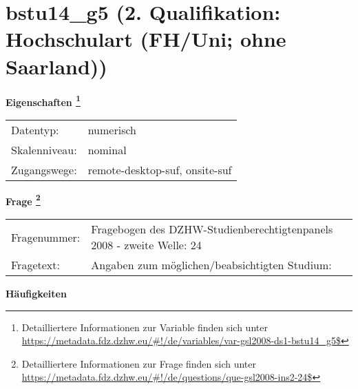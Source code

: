 
    \setcounter{footnote}{0}

    \vspace*{-1.8cm}
	\section{bstu14\_g5 (2. Qualifikation: Hochschulart (FH/Uni; ohne Saarland))}
	\label{section:bstu14_g5}



    \vspace*{0.5cm}
    \noindent\textbf{Eigenschaften
	\footnote{Detailliertere Informationen zur Variable finden sich unter
		\url{https://metadata.fdz.dzhw.eu/\#!/de/variables/var-gsl2008-ds1-bstu14_g5$}}}\\
	\begin{tabularx}{\hsize}{@{}lX}
	Datentyp: & numerisch \\
	Skalenniveau: & nominal \\
	Zugangswege: &
	  remote-desktop-suf, 
	  onsite-suf
 \\
    \end{tabularx}



				\vspace*{0.5cm}
                \noindent\textbf{Frage
	                \footnote{Detailliertere Informationen zur Frage finden sich unter
		              \url{https://metadata.fdz.dzhw.eu/\#!/de/questions/que-gsl2008-ins2-24$}}}\\
				\begin{tabularx}{\hsize}{@{}lX}
					Fragenummer: &
					  Fragebogen des DZHW-Studienberechtigtenpanels 2008 - zweite Welle:
					  24
 \\
					Fragetext: & Angaben zum möglichen/beabsichtigten Studium: \\
				\end{tabularx}





        		\vspace*{0.5cm}
                \noindent\textbf{Häufigkeiten}

